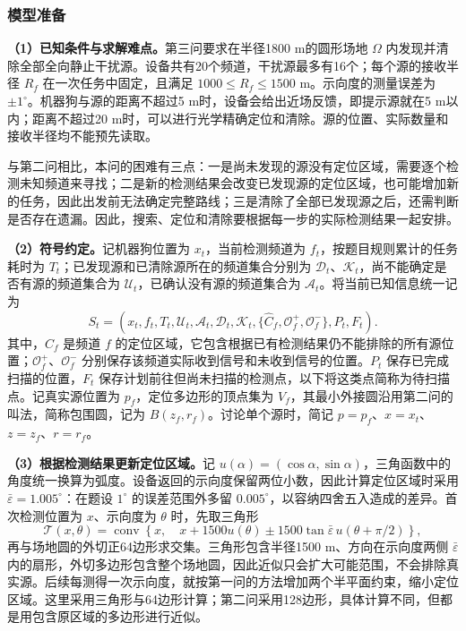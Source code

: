 \Needspace{30mm}
\subsubsection{模型准备}\label{sec:q3-1}

\textbf{（1）已知条件与求解难点。}第三问要求在半径1800 m的圆形场地 $\Omega$ 内发现并清除全部全向静止干扰源。设备共有20个频道，干扰源最多有16个；每个源的接收半径 $R_f$ 在一次任务中固定，且满足 $1000\le R_f\le1500$ m。示向度的测量误差为 $\pm1^\circ$。机器狗与源的距离不超过5 m时，设备会给出近场反馈，即提示源就在5 m以内；距离不超过20 m时，可以进行光学精确定位和清除。源的位置、实际数量和接收半径均不能预先读取。

与第二问相比，本问的困难有三点：一是尚未发现的源没有定位区域，需要逐个检测未知频道来寻找；二是新的检测结果会改变已发现源的定位区域，也可能增加新的任务，因此出发前无法确定完整路线；三是清除了全部已发现源之后，还需判断是否存在遗漏。因此，搜索、定位和清除要根据每一步的实际检测结果一起安排。

\textbf{（2）符号约定。}记机器狗位置为 $x_t$，当前检测频道为 $f_t$，按题目规则累计的任务耗时为 $T_t$；已发现源和已清除源所在的频道集合分别为 $\mathcal D_t$、$\mathcal K_t$，尚不能确定是否有源的频道集合为 $\mathcal U_t$，已确认没有源的频道集合为 $\mathcal A_t$。将当前已知信息统一记为
\begin{equation}\label{eq:q3-1}
S_t=\left(x_t,f_t,T_t,\mathcal U_t,\mathcal A_t,\mathcal D_t,\mathcal K_t,
\{\widehat C_f,\mathcal O_f^+,\mathcal O_f^-\},P_t,F_t\right).
\end{equation}
其中，$\widehat C_f$ 是频道 $f$ 的定位区域，它包含根据已有检测结果仍不能排除的所有源位置；$\mathcal O_f^+$、$\mathcal O_f^-$ 分别保存该频道实际收到信号和未收到信号的位置。$P_t$ 保存已完成扫描的位置，$F_t$ 保存计划前往但尚未扫描的检测点，以下将这类点简称为待扫描点。记真实源位置为 $p_f$，定位多边形的顶点集为 $V_f$，其最小外接圆沿用第二问的叫法，简称包围圆，记为 $B(z_f,r_f)$。讨论单个源时，简记 $p=p_f$、$x=x_t$、$z=z_f$、$r=r_f$。

\textbf{（3）根据检测结果更新定位区域。}记 $u(\alpha)=(\cos\alpha,\sin\alpha)$，三角函数中的角度统一换算为弧度。设备返回的示向度保留两位小数，因此计算定位区域时采用 $\bar\varepsilon=1.005^\circ$：在题设 $1^\circ$ 的误差范围外多留 $0.005^\circ$，以容纳四舍五入造成的差异。首次检测位置为 $x$、示向度为 $\theta$ 时，先取三角形
\[
\mathcal T(x,\theta)=\operatorname{conv}\left\{x,\quad
x+1500u(\theta)\pm1500\tan\bar\varepsilon\,u(\theta+\pi/2)\right\},
\]
再与场地圆的外切正64边形求交集。三角形包含半径1500 m、方向在示向度两侧 $\bar\varepsilon$ 内的扇形，外切多边形包含整个场地圆，因此近似只会扩大可能范围，不会排除真实源。后续每测得一次示向度，就按第一问的方法增加两个半平面约束，缩小定位区域。这里采用三角形与64边形计算；第二问采用128边形，具体计算不同，但都是用包含原区域的多边形进行近似。


